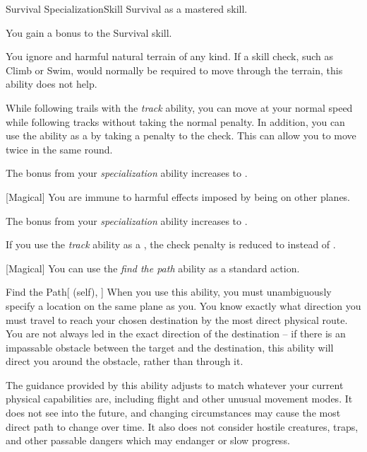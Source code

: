     \begin{feat}{Survival Specialization}{Skill}
        \featpre Survival as a mastered skill.

         You gain a  bonus to the Survival skill.

         You ignore  and harmful natural terrain of any kind.
        If a skill check, such as Climb or Swim, would normally be required to move through the terrain, this ability does not help.

        While following trails with the \textit{track} ability, you can move at your normal speed while following tracks without taking the normal  penalty.
        In addition, you can use the ability as a  by taking a  penalty to the check.
        This can allow you to move twice in the same round.

         The bonus from your \textit{specialization} ability increases to .

        [Magical] You are immune to harmful effects imposed by being on other planes.

         The bonus from your \textit{specialization} ability increases to .

         If you use the \textit{track} ability as a , the check penalty is reduced to  instead of .

        [Magical] You can use the \textit{find the path} ability as a standard action.
        \begin{attuneability}{Find the Path}[ (self), ]
            When you use this ability, you must unambiguously specify a location on the same plane as you.
            You know exactly what direction you must travel to reach your chosen destination by the most direct physical route.
            You are not always led in the exact direction of the destination -- if there is an impassable obstacle between the target and the destination, this ability will direct you around the obstacle, rather than through it.

            The guidance provided by this ability adjusts to match whatever your current physical capabilities are, including flight and other unusual movement modes. It does not see into the future, and changing circumstances may cause the most direct path to change over time.
            It also does not consider hostile creatures, traps, and other passable dangers which may endanger or slow progress.
        \end{attuneability}
    \end{feat}

